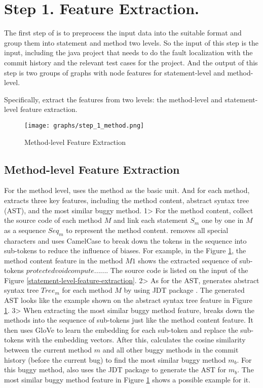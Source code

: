 \section{Step 1. Feature Extraction.}

The first step of \tool is to preprocess the input data into the suitable format and group them into statement and method two levels. So the input of this step is the \tool input, including the java project that needs to do the fault localization with the commit history and the relevant test cases for the project. And the output of this step is two groups of graphs with node features for statement-level and method-level.

Specifically, \tool extract the features from two levels: the method-level and statement-level feature extraction.

\begin{figure}[t]
	\centering
	\texttt{[image: graphs/step\_1\_method.png]}
	\caption{Method-level Feature Extraction}
	\label{method-level-feature-extraction}
\end{figure}

\subsection{Method-level Feature Extraction}
For the method level, \tool uses the method as the basic unit. And for each method, \tool extracts three key features, including the method content, abstract syntax tree (AST), and the most similar buggy method. 1> For the method content, \tool collect the source code of each method $M$ and link each statement $S_m$ one by one in $M$ as a sequence $Seq_m$ to represent the method content. \tool removes all special characters and uses CamelCase to break down the tokens in the sequence into sub-tokens to reduce the influence of biases. For example, in the Figure \ref{method-level-feature-extraction}, the method content feature in the method $M1$ shows the extracted sequence of sub-tokens $protected void compute ......$. The source code is listed on the input of the Figure \ref{statement-level-feature-extraction}. 2> As for the AST, \tool generates abstract syntax tree $Tree_m$ for each method $M$ by using JDT package \cite{JDT}. The generated AST looks like the example shown on the abstract syntax tree feature in Figure \ref{method-level-feature-extraction}. 3> When extracting the most similar buggy method feature, \tool breaks down the methods into the sequence of sub-tokens just like the method content feature. It then uses GloVe \cite{pennington2014glove} to learn the embedding for each sub-token and replace the sub-tokens with the embedding vectors. After this, \tool calculates the cosine similarity between the current method $m$ and all other buggy methods in the commit history (before the current bug) to find the most similar buggy method $m_b$. For this buggy method, \tool also uses the JDT package to generate the AST for $m_b$. The most similar buggy method feature in Figure \ref{method-level-feature-extraction} shows a possible example for it.

